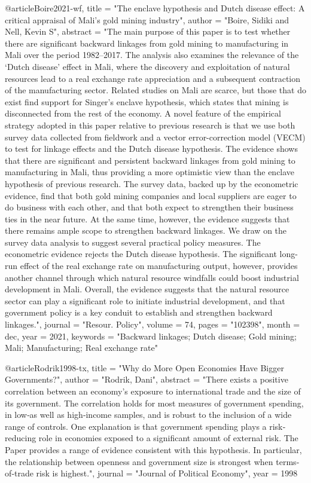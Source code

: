 {@article{Boire2021-wf,
	title    = "The enclave hypothesis and Dutch disease effect: A critical
	appraisal of Mali's gold mining industry",
	author   = "Boire, Sidiki and Nell, Kevin S",
	abstract = "The main purpose of this paper is to test whether there are
	significant backward linkages from gold mining to manufacturing
	in Mali over the period 1982--2017. The analysis also examines
	the relevance of the `Dutch disease' effect in Mali, where the
	discovery and exploitation of natural resources lead to a real
	exchange rate appreciation and a subsequent contraction of the
	manufacturing sector. Related studies on Mali are scarce, but
	those that do exist find support for Singer's enclave hypothesis,
	which states that mining is disconnected from the rest of the
	economy. A novel feature of the empirical strategy adopted in
	this paper relative to previous research is that we use both
	survey data collected from fieldwork and a vector
	error-correction model (VECM) to test for linkage effects and the
	Dutch disease hypothesis. The evidence shows that there are
	significant and persistent backward linkages from gold mining to
	manufacturing in Mali, thus providing a more optimistic view than
	the enclave hypothesis of previous research. The survey data,
	backed up by the econometric evidence, find that both gold mining
	companies and local suppliers are eager to do business with each
	other, and that both expect to strengthen their business ties in
	the near future. At the same time, however, the evidence suggests
	that there remains ample scope to strengthen backward linkages.
	We draw on the survey data analysis to suggest several practical
	policy measures. The econometric evidence rejects the Dutch
	disease hypothesis. The significant long-run effect of the real
	exchange rate on manufacturing output, however, provides another
	channel through which natural resource windfalls could boost
	industrial development in Mali. Overall, the evidence suggests
	that the natural resource sector can play a significant role to
	initiate industrial development, and that government policy is a
	key conduit to establish and strengthen backward linkages.",
	journal  = "Resour. Policy",
	volume   =  74,
	pages    = "102398",
	month    =  dec,
	year     =  2021,
	keywords = "Backward linkages; Dutch disease; Gold mining; Mali;
	Manufacturing; Real exchange rate"
}

@article{Rodrik1998-tx,
	title    = "Why do More Open Economies Have Bigger Governments?",
	author   = "Rodrik, Dani",
	abstract = "There exists a positive correlation between an economy's exposure
	to international trade and the size of its government. The
	correlation holds for most measures of government spending, in
	low‐as well as high‐income samples, and is robust to the
	inclusion of a wide range of controls. One explanation is that
	government spending plays a risk‐reducing role in economies
	exposed to a significant amount of external risk. The Paper
	provides a range of evidence consistent with this hypothesis. In
	particular, the relationship between openness and government size
	is strongest when terms‐of‐trade risk is highest.",
	journal  = "Journal of Political Economy",
	year     =  1998
}

}
